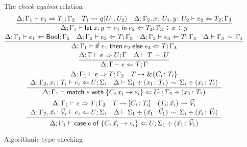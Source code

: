 \begin{figure}[t]
  The \emph{check against} relation\hfill{}
  \begin{gather*}
    \frac{
      \algtypeout[\kindEnv ; \varEnv_1]{e_1}{T_1}{\varEnv_2}
      \quad
      T_1 \Extract{} q(U_1, U_2)
      \quad
      \algtypein[\kindEnv; \varEnv_2, x\colon U_1, y\colon U_2]{e_2}{T_2}{\varEnv_3}
    }{
      \algtypein[\kindEnv;
      \varEnv_1]{\binlete{x}{y}{e_1}{e_2}}{T_2}{\varEnv_3} \div x \div y
    }
    \\
    \frac{
      \algtypein[\kindEnv;\varEnv_1]{e_1}{\boole}{\varEnv_2}
      \quad
      \algtypein[\kindEnv;\varEnv_2]{e_2}{T}{\varEnv_3}
      \quad
      \algtypein[\kindEnv;\varEnv_2]{e_3}{T}{\varEnv_4}
      \quad
      \ctxequiv{\varEnv_3}{\varEnv_4}
    }{
      \algtypein[\kindEnv;\varEnv_1]{\conditionale{e_1}{e_2}{e_3}}{T}{\varEnv_3}
    }
    \\
        \frac{
      \algtypeout e U \varEnv
      \quad
      \typeequiv T U
    }{
      \algtypein e T \varEnv
    }
    \\
    \frac{
      \begin{array}{c}
      \algtypeout[\kindEnv;\varEnv_1]{e}{T}{\varEnv_2}
      \quad
      T \Extract{} \&\{C_i\colon T_i\}
      \\
      \algtypein[\kindEnv;\varEnv_2, x_i\colon T_i]{e_i}{U}{\Sigma_i}
      \quad
      \ctxequiv{\Sigma_1 \div (x_1\colon T_1)}{\Sigma_i \div (x_i\colon T_i)} 
      \end{array}
    }{
      \algtypein[\kindEnv;\varEnv_1]{\matche{e}{\{C_i\,x_i
          \rightarrow e_i\}}}{U_1}{\Sigma_1 \div (x_1\colon T_1)}
    }
  \\
  \frac{
    \begin{array}{c}
    \algtypeout[\kindEnv;\varEnv_1]{e}{T}{\varEnv_2}
    \quad
    T \Extract{}[C_i\colon T_i]
    \quad
    (T_i;\vec x_i) \Extract{}{\vec V_i}
    \\
    \algtypein[\kindEnv;\varEnv_2, \vec x_i\colon\vec V_i]{e_i}{U}{\Sigma_i}
    \quad
    \ctxequiv{\Sigma_1 \div (\vec x_1\colon\vec V_1)}{\Sigma_i \div (\vec x_i\colon\vec V_i)} 
    \end{array}
  }{
    \algtypein[\kindEnv;\varEnv_1]{\casee{e}{\{C_i\,\vec x_i\rightarrow e_i\}}}{U}{\Sigma_1 \div (\vec x_1\colon\vec V_1)}
  }
  \end{gather*}
  \caption{Algorithmic type checking}
  \label{fig:alg-typing}
\end{figure}

